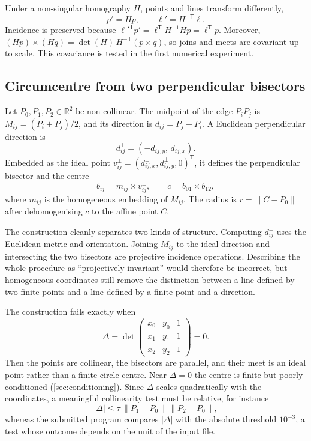 \documentclass[11pt,a4paper]{article}
\theoremstyle{plain}
\theoremstyle{definition}
\theoremstyle{remark}
\newcommand{\R}{\mathbb{R}}
\newcommand{\T}{\mathsf{T}}
\newcommand{\norm}[1]{\left\lVert#1\right\rVert}
\newcommand{\abs}[1]{\left\lvert#1\right\rvert}
\begin{document}
Under a non-singular homography $H$, points and lines transform differently,
\begin{equation}
  p'=Hp,
  \qquad
  \ell'=H^{-\T}\ell.
  \label{eq:homography}
\end{equation}
Incidence is preserved because ${\ell'}^{\T}p'=\ell^{\T}H^{-1}Hp=\ell^{\T}p$.
Moreover, $(Hp)\times(Hq)=\det(H)\,H^{-\T}(p\times q)$, so joins and meets are
covariant up to scale. This covariance is tested in the first numerical
experiment.

\subsection{Circumcentre from two perpendicular bisectors}

Let $P_0,P_1,P_2\in\R^2$ be non-collinear. The midpoint of the edge $P_iP_j$ is
$M_{ij}=(P_i+P_j)/2$, and its direction is $d_{ij}=P_j-P_i$. A Euclidean
perpendicular direction is
\begin{equation}
  d_{ij}^{\perp}=(-d_{ij,y},\,d_{ij,x}).
\end{equation}
Embedded as the ideal point $v_{ij}^{\perp}=(d_{ij,x}^{\perp},
d_{ij,y}^{\perp},0)^{\T}$, it defines the perpendicular bisector and the centre
\begin{equation}
  b_{ij}=m_{ij}\times v_{ij}^{\perp},
  \qquad
  c=b_{01}\times b_{12},
  \label{eq:circumcenter-projective}
\end{equation}
where $m_{ij}$ is the homogeneous embedding of $M_{ij}$. The radius is
$r=\norm{C-P_0}$ after dehomogenising $c$ to the affine point $C$.

The construction cleanly separates two kinds of structure. Computing
$d_{ij}^{\perp}$ uses the Euclidean metric and orientation. Joining $M_{ij}$ to
the ideal direction and intersecting the two bisectors are projective incidence
operations. Describing the whole procedure as ``projectively invariant'' would
therefore be incorrect, but homogeneous coordinates still remove the
distinction between a line defined by two finite points and a line defined by a
finite point and a direction.

The construction fails exactly when
\begin{equation}
  \Delta=\det\begin{pmatrix}
  x_0&y_0&1\\x_1&y_1&1\\x_2&y_2&1
  \end{pmatrix}=0.
  \label{eq:area-predicate}
\end{equation}
Then the points are collinear, the bisectors are parallel, and their meet is
an ideal point rather than a finite circle centre. Near $\Delta=0$ the centre
is finite but poorly conditioned (\cref{sec:conditioning}). Since $\Delta$
scales quadratically with the coordinates, a meaningful collinearity test must
be relative, for instance
\begin{equation}
  \abs{\Delta}\le\tau\,\norm{P_1-P_0}\,\norm{P_2-P_0},
  \label{eq:relative-collinearity}
\end{equation}
whereas the submitted program compares $\abs{\Delta}$ with the absolute
threshold $10^{-3}$, a test whose outcome depends on the unit of the input
file.
\end{document}

